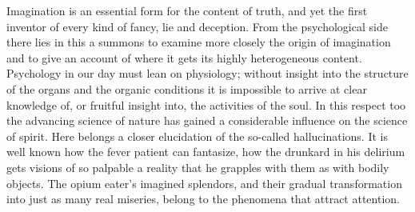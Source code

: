 \documentclass[12pt,a4paper,openany]{book}
\newcommand{\opage}[1]{\marginnote{\footnotesize\textit{[#1]}}}
\begin{document}
Imagination is an essential form for the content of truth, and yet the first inventor of every kind of fancy, lie and deception. From the psychological side there lies
\setcounter{footnote}{0}%
\opage{80}in this a summons to examine more closely the origin of imagination and to give an account of where it gets its highly heterogeneous content. Psychology in our day must lean on physiology; without insight into the structure of the organs and the organic conditions it is impossible to arrive at clear knowledge of, or fruitful insight into, the activities of the soul. In this respect too the advancing science of nature has gained a considerable influence on the science of spirit. Here belongs a closer elucidation of the so-called hallucinations. It is well known how the fever patient can fantasize, how the drunkard in his delirium gets visions of so palpable a reality that he grapples with them as with bodily objects. The opium eater's imagined splendors, and their gradual transformation into just as many real miseries, belong to the phenomena that attract attention.
\end{document}
